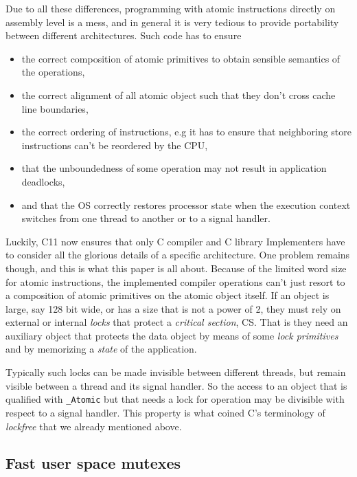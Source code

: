 \documentclass{sig-alternate-05-2015}
\begin{document}
Due to all these differences, programming with atomic instructions
directly on assembly level is a mess, and in general it is very
tedious to provide portability between different
architectures. Such code has to ensure\vspace*{-2ex}
\begin{itemize}
\item the correct composition of atomic primitives to obtain sensible
semantics of the operations,\vspace*{-2ex}
\item the correct alignment of all atomic object such that they don't
cross cache line boundaries,\vspace*{-2ex}
\item the correct ordering of instructions, e.g it has to ensure that
neighboring store instructions can't be reordered by the CPU,
\item that the unboundedness of some operation may not result in
application deadlocks,\vspace*{-2ex}
\item and that the OS correctly restores processor state when the
execution context switches from one thread to another or to a
signal handler.
\end{itemize}

Luckily, C11 now ensures that only C compiler and C library
Implementers have to consider all the glorious details of a
specific architecture. One problem remains though, and this is what
this paper is all about. Because of the limited word size for
atomic instructions, the implemented compiler operations can't just
resort to a composition of atomic primitives on the atomic object
itself. If an object is large, say 128 bit wide, or has a size that
is not a power of 2, they must rely on external or internal \emph{locks}
that protect a \emph{critical section}, CS. That is they need an
auxiliary object that protects the data object by means of some
\emph{lock primitives} and by memorizing a \emph{state} of the application.

Typically such locks can be made invisible between different
threads, but remain visible between a thread and its signal
handler. So the access to an object that is qualified with
\texttt{\_Atomic} but that needs a lock for operation may be divisible with
respect to a signal handler. This property is what coined C's
terminology of \emph{lockfree} that we already mentioned above.


\subsection{Fast user space mutexes}
\label{sec-2-3}
\end{document}
